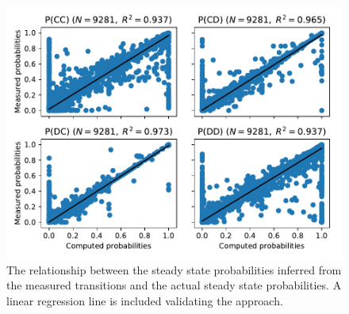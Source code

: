 \documentclass[a4paper]{article}
\begin{document}
\begin{figure}[!htbp]
    \centering
    \includegraphics[width=.8\textwidth]{./assets/img/computed_probabilities_vs_theoretic_probabilities/main.pdf}
    \caption{The
        relationship between the steady state probabilities inferred from the
        measured transitions and the actual steady state probabilities. A linear
        regression line is included validating the approach.}
    \label{fig:computed_probabilities_vs_theoretic_probabilities}
\end{figure}

\newpage


\end{document}
